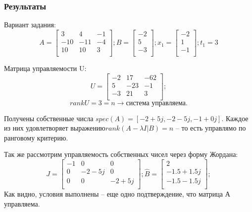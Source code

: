 \subsubsection{Результаты}
Вариант задания:
\[ A = \begin{bmatrix}
        3 & 4 & -1 \\
        -10 & -11 & -4 \\
        10 & 10 & 3 \\
        \end{bmatrix}; 
        B = \begin{bmatrix}
                -2 \\
                5 \\
                -3 \\
                \end{bmatrix}; 
        x_1 = \begin{bmatrix}
                -2 \\
                1 \\
                -1 \\
                \end{bmatrix}; 
        t_1 = 3
\]

Матрица управляемости U:
\[ U = \begin{bmatrix}
        -2 & 17 & -62 \\
        5 & -23 & -1 \\
        -3 & 21 & 3 \\
        \end{bmatrix};
\]
\[rankU = 3 = n \rightarrow \text{система управляема.}\]

Получены собственные числа \(spec(A) = [-2+5j, -2 -5j, -1+0j]\). Каждое из них удовлетворяет выражению\(rank(A - \lambda I | B) = n \) -- то есть управлямо по ранговому критерию.

Так же рассмотрим управляемость собственных чисел через форму Жордана:
\[
        J = \begin{bmatrix}
                -1 & 0 & 0 \\
                0 & -2 - 5j & 0 \\
                0 & 0 & -2 + 5j \\
                \end{bmatrix};
        \hat{B} = \begin{bmatrix}
                2 \\
                -1.5 + 1.5j \\
                -1.5 - 1.5j \\
                \end{bmatrix};
\]
Как видно, условия выполнены -- еще одно подтверждение, что матрица А управляема.

